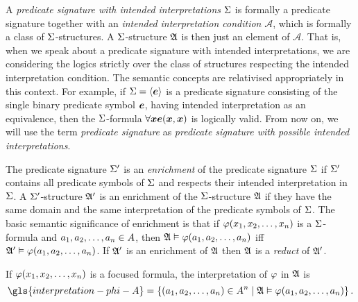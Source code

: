 
A \emph{predicate signature with intended interpretations} $\mathrm{\Sigma}$ is formally a
predicate signature together with an \emph{intended interpretation condition}
$\mathcal{A}$, which is formally a class of $\mathrm{\Sigma}$-structures.
A $\mathrm{\Sigma}$-structure $\mathfrak{A}$ is then just an element of $\mathcal{A}$. That is,
when we speak about a predicate signature with intended interpretations,
we are considering the logics strictly over the class of structures respecting
the intended interpretation condition. The semantic concepts are relativised
appropriately in this context. For example, if $\mathrm{\Sigma} = \left\langle \bm{e} \right\rangle$ is a
predicate signature consisting of the single binary predicate symbol $\bm{e}$,
having intended interpretation as an equivalence, then the $\mathrm{\Sigma}$-formula
$\forall\bm{x} \bm{e}(\bm{x},\bm{x})$ is logically valid.
From now on, we will use the term \emph{predicate signature} as \emph{predicate
signature with possible intended interpretations}.

The predicate signature $\mathrm{\Sigma'}$ is an \emph{enrichment} of the predicate
signature $\mathrm{\Sigma}$ if $\mathrm{\Sigma'}$ contains all predicate symbols of $\mathrm{\Sigma}$ and
respects their intended interpretation in $\mathrm{\Sigma}$. A $\mathrm{\Sigma'}$-structure $\mathfrak{A'}$
is an enrichment of the $\mathrm{\Sigma}$-structure $\mathfrak{A}$ if they have the same domain
and the same interpretation of the predicate symbols of $\mathrm{\Sigma}$.
The basic semantic significance of enrichment is that if
$\varphi(x_{1}, x_{2}, \dots, x_{n})$ is a $\mathrm{\Sigma}$-formula and $a_{1}, a_{2},
\dots, a_{n} \in A$, then $\mathfrak{A} \vDash \varphi(a_{1}, a_{2}, \dots, a_{n})$
iff $\mathfrak{A'} \vDash \varphi(a_{1}, a_{2}, \dots, a_{n})$.
If $\mathfrak{A'}$ is an enrichment of $\mathfrak{A}$ then $\mathfrak{A}$ is a
\emph{reduct}
of $\mathfrak{A'}$.

If $\varphi(x_{1}, x_{2}, \dots, x_{n})$ is a focused formula, the
interpretation of $\varphi$ in $\mathfrak{A}$ is
\[
  \gls{interpretation-phi-A} = \setbd{(\eaa1, \eaa2, \dots, \eaa\nn) \in
  \domA^\nn}{\StrA \vDash \fphi(\eaa1, \eaa2, \dots, \eaa\nn)}.
\]